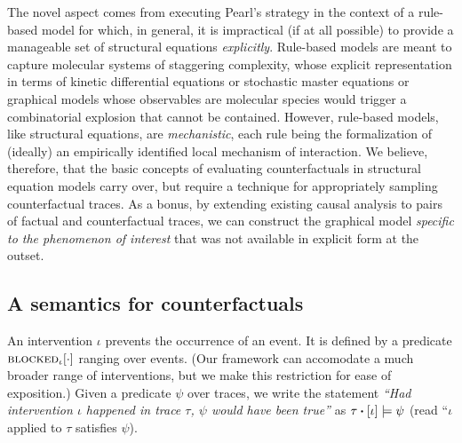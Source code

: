The novel aspect comes from executing Pearl's strategy in the context
of a rule-based model for which, in general, it is impractical (if at
all possible) to provide a manageable set of structural equations
\emph{explicitly}. Rule-based models are meant to capture molecular
systems of staggering complexity, whose explicit representation in
terms of kinetic differential equations or stochastic master equations
or graphical models whose observables are molecular species would
trigger a combinatorial explosion that cannot be contained. However,
rule-based models, like structural equations, are \emph{mechanistic},
each rule being the formalization of (ideally) an empirically
identified local mechanism of interaction. We believe, therefore, that
the basic concepts of evaluating counterfactuals in structural
equation models carry over, but require a technique for appropriately
sampling counterfactual traces. As a bonus, by extending existing
causal analysis to pairs of factual and counterfactual traces, we can
construct the graphical model \emph{specific to the phenomenon of
  interest} that was not available in explicit form at the outset.

\subsection{A semantics for counterfactuals}
\label{sec:counterfactuals-semantics}

An intervention $\iota$ prevents the occurrence of an event. It is
defined by a predicate ${\textsc{blocked}}_{\iota}[\cdot]$ ranging over
events. (Our framework can accomodate a much broader range of
interventions, but we make this restriction for ease of exposition.)
Given a predicate $\psi$ over traces, we write the statement
\textit{``Had intervention $\iota$ happened in trace $\tau$, $\psi$
  would have been true''} as $\UPDATE{\tau}{[\iota]} \models \psi$
(read ``$\iota$ applied to $\tau$ satisfies $\psi$).

